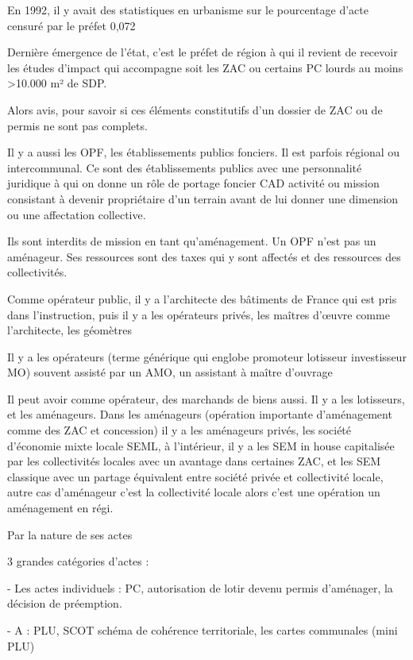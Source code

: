 		En 1992, il y avait des statistiques en urbanisme sur le pourcentage d’acte censuré par le préfet 0,072%

		Dernière émergence de l’état, c’est le préfet de région à qui il revient de recevoir les études d’impact qui accompagne soit les ZAC ou certains PC lourds au moins >10.000 m² de SDP.

		Alors avis, pour savoir si ces éléments constitutifs d’un dossier de ZAC ou de permis ne sont pas complets.

		Il y a aussi les OPF, les établissements publics fonciers. Il est parfois régional ou intercommunal. Ce sont des établissements publics avec une personnalité juridique à qui on donne un rôle de portage foncier CAD activité ou mission consistant à devenir propriétaire d’un terrain avant de lui donner une dimension ou une affectation collective.

		Ils sont interdits de mission en tant qu’aménagement. Un OPF n’est pas un aménageur. Ses ressources sont des taxes qui y sont affectés et des ressources des collectivités.

		Comme opérateur public, il y a l’architecte des bâtiments de France qui est pris dans l’instruction, puis il y a les opérateurs privés, les maîtres d’œuvre comme l’architecte, les géomètres

		Il y a les opérateurs (terme générique qui englobe promoteur lotisseur investisseur MO) souvent assisté par un AMO, un assistant à maître d’ouvrage

		Il peut avoir comme opérateur, des marchands de biens aussi. Il y a les lotisseurs, et les aménageurs. Dans les aménageurs (opération importante d’aménagement comme des ZAC et concession) il y a les aménageurs privés, les société d’économie mixte locale SEML, à l’intérieur, il y a les SEM in house capitalisée par les collectivités locales avec un avantage dans certaines ZAC, et les SEM classique avec un partage équivalent entre société privée et collectivité locale, autre cas d’aménageur c’est la collectivité locale alors c’est une opération un aménagement en régi.

		
		
		
		
		
		Par la nature de ses actes

		3 grandes catégories d’actes :

		-	Les actes individuels : PC, autorisation de lotir devenu permis d’aménager, la décision de préemption.

		-	A : PLU, SCOT schéma de cohérence territoriale, les cartes communales (mini PLU)

